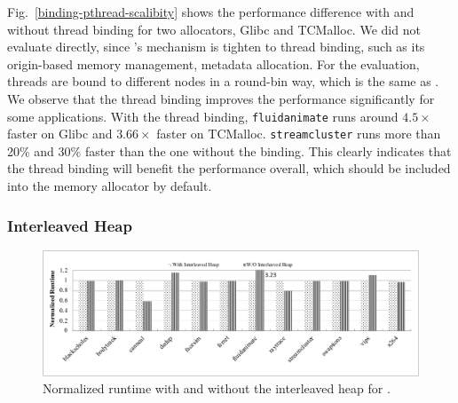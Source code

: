 Fig.~\ref{binding-pthread-scalibity} shows the performance difference with and without thread binding for two allocators, Glibc and TCMalloc. We did not evaluate \NM{} directly, since \NM{}'s mechanism is tighten to thread binding, such as its origin-based memory management, metadata allocation. For the evaluation, threads are bound to different nodes in a round-bin way, which is the same as \NM{}. We observe that the thread binding improves the performance significantly for some applications. With the thread binding, \texttt{fluidanimate} runs around $4.5\times$ faster on Glibc and $3.66\times$ faster on TCMalloc. \texttt{streamcluster} runs more than 20\% and 30\% faster than the one without the binding. This clearly indicates that the thread binding will benefit the performance overall, which should be included into the memory allocator by default. 


\subsubsection{Interleaved Heap} 
\label{sec:interleavedheap}

\begin{figure}[!ht]
    \centering
    \includegraphics[width=5.5in]{figure/interleavedheap.pdf}
    \caption{Normalized runtime with and without the interleaved heap for \NM{}.  \label{fig:interleavedheap}}  
\end{figure}



